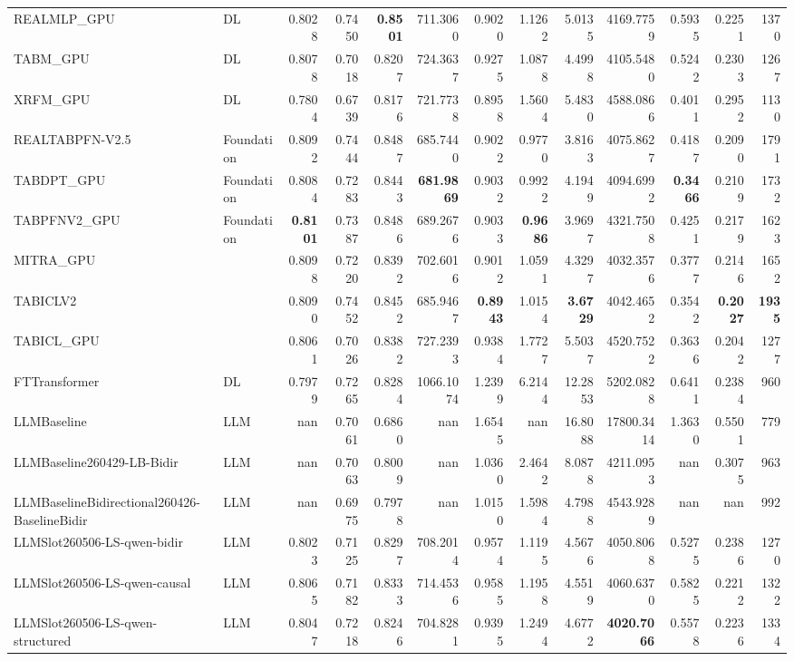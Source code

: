 \begin{table}[htbp]
{\begin{tabular}{ll|rrrrrrrrrr|r}
REALMLP\_GPU & DL & 0.8028 & 0.7450 & \textbf{0.8501} & 711.3060 & 0.9020 & 1.1262 & 5.0135 & 4169.7759 & 0.5935 & 0.2251 & 1370 \\
TABM\_GPU & DL & 0.8078 & 0.7018 & 0.8207 & 724.3637 & 0.9275 & 1.0878 & 4.4998 & 4105.5480 & 0.5242 & 0.2303 & 1267 \\
XRFM\_GPU & DL & 0.7804 & 0.6739 & 0.8176 & 721.7738 & 0.8958 & 1.5604 & 5.4830 & 4588.0866 & 0.4011 & 0.2952 & 1130 \\
REALTABPFN-V2.5 & Foundation & 0.8092 & 0.7444 & 0.8487 & 685.7440 & 0.9022 & 0.9770 & 3.8163 & 4075.8627 & 0.4187 & 0.2090 & 1791 \\
TABDPT\_GPU & Foundation & 0.8084 & 0.7283 & 0.8443 & \textbf{681.9869} & 0.9032 & 0.9922 & 4.1949 & 4094.6992 & \textbf{0.3466} & 0.2109 & 1732 \\
TABPFNV2\_GPU & Foundation & \textbf{0.8101} & 0.7387 & 0.8486 & 689.2676 & 0.9033 & \textbf{0.9686} & 3.9697 & 4321.7508 & 0.4251 & 0.2179 & 1623 \\
MITRA\_GPU &  & 0.8098 & 0.7220 & 0.8392 & 702.6016 & 0.9012 & 1.0591 & 4.3297 & 4032.3576 & 0.3777 & 0.2146 & 1652 \\
TABICLV2 &  & 0.8090 & 0.7452 & 0.8452 & 685.9467 & \textbf{0.8943} & 1.0154 & \textbf{3.6729} & 4042.4652 & 0.3542 & \textbf{0.2027} & \textbf{1935} \\
TABICL\_GPU &  & 0.8061 & 0.7026 & 0.8382 & 727.2393 & 0.9384 & 1.7727 & 5.5037 & 4520.7522 & 0.3636 & 0.2042 & 1277 \\
\midrule
FTTransformer & DL & 0.7979 & 0.7265 & 0.8284 & 1066.1074 & 1.2399 & 6.2144 & 12.2853 & 5202.0828 & 0.6411 & 0.2384 & 960 \\
LLMBaseline & LLM & nan & 0.7061 & 0.6860 & nan & 1.6545 & nan & 16.8088 & 17800.3414 & 1.3630 & 0.5501 & 779 \\
LLMBaseline260429-LB-Bidir & LLM & nan & 0.7063 & 0.8009 & nan & 1.0360 & 2.4642 & 8.0878 & 4211.0953 & nan & 0.3075 & 963 \\
LLMBaselineBidirectional260426-BaselineBidir & LLM & nan & 0.6975 & 0.7978 & nan & 1.0150 & 1.5984 & 4.7988 & 4543.9289 & nan & nan & 992 \\
LLMSlot260506-LS-qwen-bidir & LLM & 0.8023 & 0.7125 & 0.8297 & 708.2014 & 0.9574 & 1.1195 & 4.5676 & 4050.8068 & 0.5275 & 0.2386 & 1270 \\
LLMSlot260506-LS-qwen-causal & LLM & 0.8065 & 0.7182 & 0.8333 & 714.4536 & 0.9585 & 1.1958 & 4.5519 & 4060.6370 & 0.5825 & 0.2212 & 1322 \\
LLMSlot260506-LS-qwen-structured & LLM & 0.8047 & 0.7218 & 0.8246 & 704.8281 & 0.9395 & 1.2494 & 4.6772 & \textbf{4020.7066} & 0.5578 & 0.2236 & 1334 \\

\end{tabular}}
\end{table}
